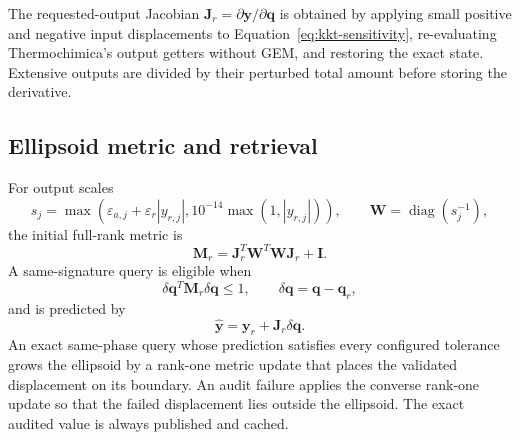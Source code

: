 \documentclass[11pt]{article}
\newcommand{\abs}[1]{\left\lvert #1\right\rvert}
\begin{document}
The requested-output Jacobian $\mathbf{J}_r=\partial\boldsymbol{y}/\partial\boldsymbol{q}$ is
obtained by applying small positive and negative input displacements to Equation~\eqref{eq:kkt-sensitivity},
re-evaluating Thermochimica's output getters without GEM, and restoring the exact state.  Extensive
outputs are divided by their perturbed total amount before storing the derivative.

\subsection{Ellipsoid metric and retrieval}

For output scales
\begin{equation}
  s_j=\max\left(\varepsilon_{a,j}+\varepsilon_r\abs{y_{r,j}},
  10^{-14}\max(1,\abs{y_{r,j}})\right),
  \qquad \mathbf{W}=\operatorname{diag}(s_j^{-1}),
\end{equation}
the initial full-rank metric is
\begin{equation}
  \mathbf{M}_r=\mathbf{J}_r^T\mathbf{W}^T\mathbf{W}\mathbf{J}_r+\mathbf{I}.
  \label{eq:eoa-metric}
\end{equation}
A same-signature query is eligible when
\begin{equation}
  \delta\boldsymbol{q}^T\mathbf{M}_r\delta\boldsymbol{q}\leq 1,
  \qquad \delta\boldsymbol{q}=\boldsymbol{q}-\boldsymbol{q}_r,
\end{equation}
and is predicted by
\begin{equation}
  \widehat{\boldsymbol{y}}=\boldsymbol{y}_r+\mathbf{J}_r\delta\boldsymbol{q}.
  \label{eq:kkt-predictor}
\end{equation}
An exact same-phase query whose prediction satisfies every configured tolerance grows the
ellipsoid by a rank-one metric update that places the validated displacement on its boundary.  An
audit failure applies the converse rank-one update so that the failed displacement lies outside
the ellipsoid.  The exact audited value is always published and cached.
\end{document}
